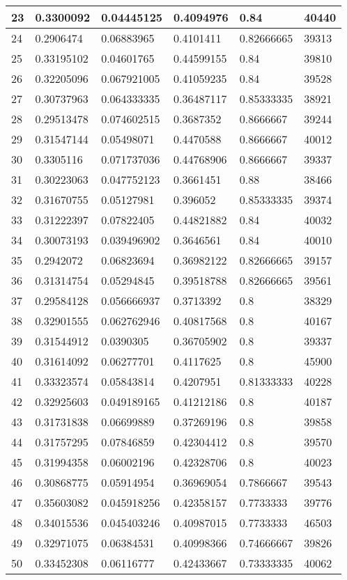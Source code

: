 \begin{longtable}{|l|l|l|l|l|l|}
23 & 0.3300092 & 0.04445125 & 0.4094976 & 0.84 & 40440 \\ \hline 
24 & 0.2906474 & 0.06883965 & 0.4101411 & 0.82666665 & 39313 \\ \hline 
25 & 0.33195102 & 0.04601765 & 0.44599155 & 0.84 & 39810 \\ \hline 
26 & 0.32205096 & 0.067921005 & 0.41059235 & 0.84 & 39528 \\ \hline 
27 & 0.30737963 & 0.064333335 & 0.36487117 & 0.85333335 & 38921 \\ \hline 
28 & 0.29513478 & 0.074602515 & 0.3687352 & 0.8666667 & 39244 \\ \hline 
29 & 0.31547144 & 0.05498071 & 0.4470588 & 0.8666667 & 40012 \\ \hline 
30 & 0.3305116 & 0.071737036 & 0.44768906 & 0.8666667 & 39337 \\ \hline 
31 & 0.30223063 & 0.047752123 & 0.3661451 & 0.88 & 38466 \\ \hline 
32 & 0.31670755 & 0.05127981 & 0.396052 & 0.85333335 & 39374 \\ \hline 
33 & 0.31222397 & 0.07822405 & 0.44821882 & 0.84 & 40032 \\ \hline 
34 & 0.30073193 & 0.039496902 & 0.3646561 & 0.84 & 40010 \\ \hline 
35 & 0.2942072 & 0.06823694 & 0.36982122 & 0.82666665 & 39157 \\ \hline 
36 & 0.31314754 & 0.05294845 & 0.39518788 & 0.82666665 & 39561 \\ \hline 
37 & 0.29584128 & 0.056666937 & 0.3713392 & 0.8 & 38329 \\ \hline 
38 & 0.32901555 & 0.062762946 & 0.40817568 & 0.8 & 40167 \\ \hline 
39 & 0.31544912 & 0.0390305 & 0.36705902 & 0.8 & 39337 \\ \hline 
40 & 0.31614092 & 0.06277701 & 0.4117625 & 0.8 & 45900 \\ \hline 
41 & 0.33323574 & 0.05843814 & 0.4207951 & 0.81333333 & 40228 \\ \hline 
42 & 0.32925603 & 0.049189165 & 0.41212186 & 0.8 & 40187 \\ \hline 
43 & 0.31731838 & 0.06699889 & 0.37269196 & 0.8 & 39858 \\ \hline 
44 & 0.31757295 & 0.07846859 & 0.42304412 & 0.8 & 39570 \\ \hline 
45 & 0.31994358 & 0.06002196 & 0.42328706 & 0.8 & 40023 \\ \hline 
46 & 0.30868775 & 0.05914954 & 0.36969054 & 0.7866667 & 39543 \\ \hline 
47 & 0.35603082 & 0.045918256 & 0.42358157 & 0.7733333 & 39776 \\ \hline 
48 & 0.34015536 & 0.045403246 & 0.40987015 & 0.7733333 & 46503 \\ \hline 
49 & 0.32971075 & 0.06384531 & 0.40998366 & 0.74666667 & 39826 \\ \hline 
50 & 0.33452308 & 0.06116777 & 0.42433667 & 0.73333335 & 40062 \\ \hline 
\end{longtable}
